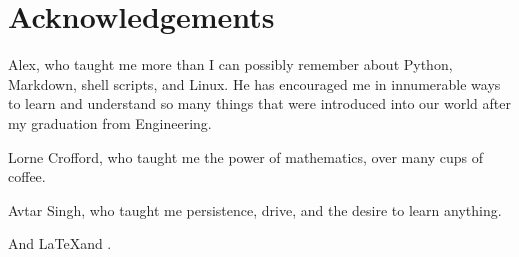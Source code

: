 \chapter{Acknowledgements}
\label{ch:acknowledgements}

Alex, who taught me more than I can possibly remember about Python, Markdown, shell scripts, and Linux. He has encouraged me in innumerable ways to learn and understand so many things that were introduced into our world after my graduation from Engineering.

Lorne Crofford, who taught me the power of mathematics, over many cups of coffee.

Avtar Singh, who taught me persistence, drive, and the desire to learn anything.

And \LaTeX and \LaTeXe .
